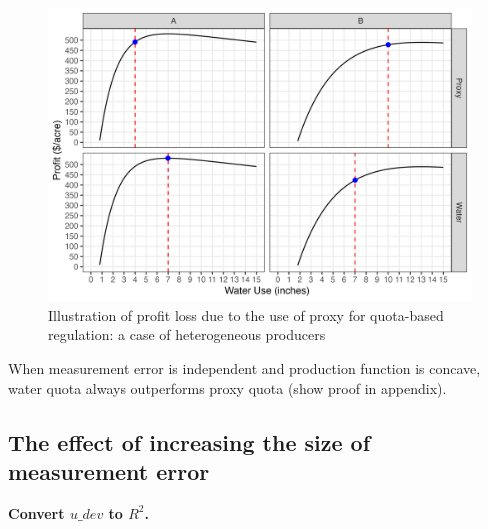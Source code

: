 \documentclass[
]{article}
\begin{document}
\begin{figure}[H]

{\centering \includegraphics{figures/g_illustration_het} 

}

\caption{Illustration of profit loss due to the use of proxy for quota-based regulation: a case of heterogeneous producers}\label{fig:illust-heterogeneous}
\end{figure}

When measurement error is independent and production function is concave, water quota always outperforms proxy quota (show proof in appendix).

\hypertarget{the-effect-of-increasing-the-size-of-measurement-error}{%
\subsection{The effect of increasing the size of measurement error}\label{the-effect-of-increasing-the-size-of-measurement-error}}

\textbf{Convert $u\_dev$ to $R^2$.}
\end{document}
